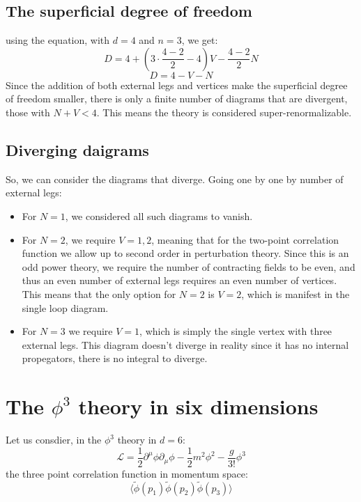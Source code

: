 \documentclass{article}
\begin{document}
\subsection{The superficial degree of freedom}
using the equation, with $d = 4$ and $n = 3$, we get:
\begin{equation}
    D = 4 + \left(3 \cdot \frac{4 - 2}{2} - 4\right)V - \frac{4 - 2}{2}N
\end{equation}
\begin{equation}
    D = 4 - V - N
\end{equation}
Since the addition of both external legs and vertices make the superficial degree of freedom smaller, there is only a finite number of diagrams that are divergent, those with $N + V < 4$. This means the theory is considered super-renormalizable.
\subsection{Diverging daigrams}
So, we can consider the diagrams that diverge. Going one by one by number of external legs:
\begin{itemize}
    \item For $N = 1$, we considered all such diagrams to vanish.
    \item For $N = 2$, we require $V = 1, 2$, meaning that for the two-point correlation function we allow up to second order in perturbation theory. Since this is an odd power theory, we require the number of contracting fields to be even, and thus an even number of external legs requires an even number of vertices. This means that the only option for $N = 2$ is $V = 2$, which is manifest in the single loop diagram.
    \item For $N = 3$ we require $V = 1$, which is simply the single vertex with three external legs. This diagram doesn't diverge in reality since it has no internal propegators, there is no integral to diverge.
\end{itemize}

\newpage
\section{The $\phi^3$ theory in six dimensions}
Let us consdier, in the $\phi^3$ theory in $d = 6$:
\begin{equation}
    \mathcal{L} = \frac{1}{2}\partial^\mu\phi\partial_\mu\phi - \frac{1}{2}m^2\phi^2 - \frac{g}{3!}\phi^3
\end{equation}
the three point correlation function in momentum space:
\begin{equation}
    \langle \tilde{\phi}(p_1) \tilde{\phi}(p_2) \tilde{\phi}(p_3) \rangle
\end{equation}
\end{document}
